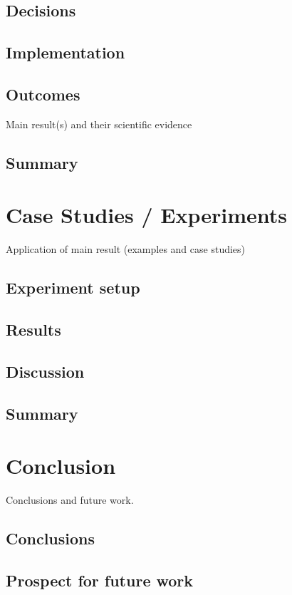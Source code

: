 \documentclass[
  oneside,
  11pt, a4paper,
  footinclude=true,
  headinclude=true,
  cleardoublepage=empty
]{scrbook}
\begin{document}
	\section{Decisions}
    \section{Implementation}
    \section{Outcomes}
    Main result(s) and their scientific evidence
	\section{Summary}


	\chapter{Case Studies / Experiments}
		Application of main result (examples and case studies)
	\section{Experiment setup}
    \section{Results}
    \section{Discussion}
	\section{Summary}

	\chapter{Conclusion}
		Conclusions and future work.
	\section{Conclusions}
	\section{Prospect for future work}
	
\fi	
			
\end{document}
